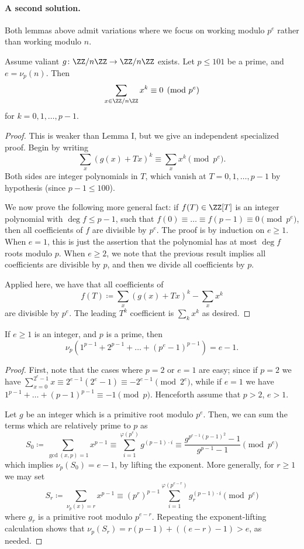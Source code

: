 \paragraph{A second solution.}
Both lemmas above admit variations
where we focus on working modulo $p^e$ rather than working modulo $n$.
\begin{lemma*}
  [Lemma I']
  Assume valiant $g \colon \ZZ/n\ZZ \to \ZZ/n\ZZ$ exists.
  Let $p \le 101$ be a prime, and $e = \nu_p(n)$.
  Then \[ \sum_{x \in \ZZ/n\ZZ} x^k \equiv 0 \pmod{p^e} \]
  for $k = 0, 1, \dots, p-1$.
\end{lemma*}
\begin{proof}
  This is weaker than Lemma I,
  but we give an independent specialized proof.
  Begin by writing
  \[ \sum_x \left( g(x) + Tx \right)^k \equiv \sum_x x^k \pmod{p^e}. \]
  Both sides are integer polynomials in $T$,
  which vanish at $T = 0, 1, \dots, p-1$ by hypothesis
  (since $p-1 \le 100$).

  We now prove the following more general fact:
  if $f(T) \in \ZZ[T]$ is an integer polynomial with $\deg f \le p-1$,
  such that $f(0) \equiv \dots \equiv f(p-1) \equiv 0 \pmod{p^e}$,
  then all coefficients of $f$ are divisible by $p^e$.
  The proof is by induction on $e \ge 1$.
  When $e = 1$, this is just the assertion that
  the polynomial has at most $\deg f$ roots modulo $p$.
  When $e \ge 2$, we note that the previous result
  implies all coefficients are divisible by $p$,
  and then we divide all coefficients by $p$.

  Applied here, we have that all coefficients of
  \[ f(T) \coloneqq \sum_x \left( g(x) + Tx \right)^k - \sum_x x^k \]
  are divisible by $p^e$.
  The leading $T^k$ coefficient is $\sum_k x^k$ as desired.
\end{proof}

\begin{lemma*}
  [Lemma II']
  If $e \ge 1$ is an integer,
  and $p$ is a prime, then
  \[ \nu_p\left( 1^{p-1} + 2^{p-1} + \dots + (p^e-1)^{p-1}  \right)
    = e-1. \]
\end{lemma*}
\begin{proof}
  First, note that the cases where $p = 2$ or $e = 1$
  are easy; since if $p = 2$ we have
  $\sum_{x = 0}^{2^e - 1} x \equiv 2^{e - 1}(2^e - 1)
    \equiv -2^{e - 1}\pmod{2^e}$,
  while if $e = 1$ we have $1^{p-1} + \dots + (p-1)^{p-1} \equiv -1 \pmod p$.
  Henceforth assume that $p > 2$, $e > 1$.

  Let $g$ be an integer which is a primitive root modulo $p^e$.
  Then, we can sum the terms which are relatively prime to $p$ as
  \[ S_0 \coloneqq \sum_{\gcd(x,p) = 1} x^{p-1}
    \equiv \sum_{i=1}^{\varphi(p^e)} g^{(p-1) \cdot i}
    \equiv \frac{g^{p^{e-1}(p-1)^2} - 1}{g^{p-1}-1}
    \pmod{p^e}
  \]
  which implies $\nu_p(S_0) = e-1$, by lifting the exponent.
  More generally, for $r \ge 1$ we may set
  \[ S_r \coloneqq \sum_{\nu_p(x) = r} x^{p-1}
    \equiv (p^r)^{p-1} \sum_{i=1}^{\varphi(p^{e-r})}
      g_r^{(p-1) \cdot i}
    \pmod{p^e}
  \]
  where $g_r$ is a primitive root modulo $p^{e-r}$.
  Repeating the exponent-lifting calculation
  shows that $\nu_p(S_r) = r(p-1) + \left( (e-r)-1 \right) > e$,
  as needed.
\end{proof}

